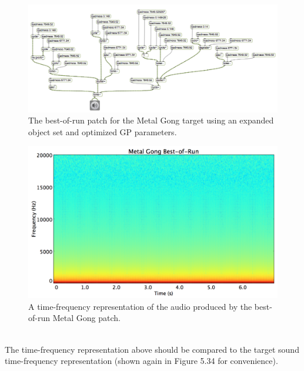 \documentclass[12pt]{report} 	%
\numberwithin{figure}{chapter}
\numberwithin{table}{chapter}
\numberwithin{equation}{chapter}
\begin{document}
\begin{flushleft}
\begin{figure}[h!]
\begin{center}
\includegraphics[angle=270, scale=0.45]{MetalGong_Best}
\caption[Metal gong best-of-run patch]{The best-of-run patch for the Metal Gong target using an expanded object set and optimized GP parameters.}
\end{center}
\end{figure}
\begin{figure}[h!]
\begin{center}
\includegraphics[scale=0.35,width=\linewidth]{MetalGongBestOfRunSTFT}
\caption[Best-of-run metal gong time-frequency representation]{A time-frequency representation of the audio produced by the best-of-run Metal Gong patch.}
\end{center}
\end{figure}
\\
The time-frequency representation above should be compared to the target sound time-frequency representation (shown again in Figure 5.34 for convenience).
\begin{figure}[h!]
\begin{center}

\end{center}
\end{figure}
\end{flushleft}
\end{document}
